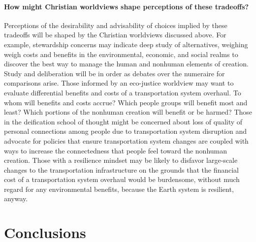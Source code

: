 \documentclass[12pt]{article}
\begin{document}
\paragraph{How might Christian worldviews shape perceptions of these tradeoffs?} 

Perceptions of the desirability and advisability of choices implied by these tradeoffs 
will be shaped by the Christian worldviews discussed above.
For example, stewardship concerns may indicate deep study of alternatives, 
weighing weigh costs and benefits in the environmental, economic, and social realms
to discover the best way to manage the human and nonhuman elements of creation.
Study and deliberation will be in order as debates over the numeraire for comparisons arise.
Those informed by an eco-justice worldview may want to evaluate 
differential benefits and costs of a transportation system overhaul.
To whom will benefits and costs accrue? 
Which people groups will benefit most and least? 
Which portions of the nonhuman creation will benefit or be harmed? 
Those in the deification school of thought might be concerned 
about loss of quality of personal connections 
among people due to transportation system disruption
and advocate for policies that ensure transportation system changes 
are coupled with ways to increase the connectedness that people
feel toward the nonhuman creation.
Those with a resilience mindset may be likely to disfavor 
large-scale changes to the transportation infrastructure 
on the grounds that the financial cost of a transportation system overhaul would be burdensome,
without much regard for any environmental benefits, 
because the Earth system is resilient, anyway.







\section{Conclusions}
\label{sec:conclusions}

\end{document}
